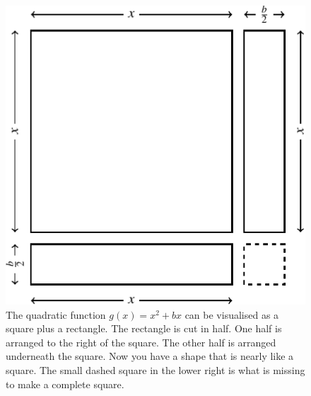 \documentclass[a4paper,oneside,12pt]{article}
\begin{document}
\begin{figure}[!htbp]
\centering
\includegraphics[scale=1.1]{image/10/complete-square-a1-c0_halfb.pdf}
\caption{%
  The quadratic function $g(x) = x^2 + bx$ can be visualised as a
  square plus a rectangle.  The rectangle is cut in half.  One half is
  arranged to the right of the square.  The other half is arranged
  underneath the square.  Now you have a shape that is nearly like a
  square.  The small dashed square in the lower right is what is
  missing to make a complete square.
}
\label{fig:special_complete_square_nearly_square}
\end{figure}
\end{document}
